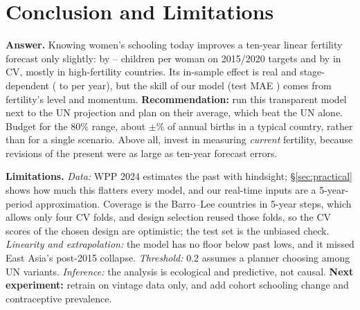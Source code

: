 \documentclass[11pt]{article}
\begin{document}
\section{Conclusion and Limitations}
\textbf{Answer.} Knowing women's schooling today improves a ten-year linear fertility forecast only slightly: by \eduGainLo--\eduGainHi{} children per woman on 2015/2020 targets and by \cvEduGainAbs{} in CV, mostly in high-fertility countries. Its in-sample effect is real and stage-dependent (\effTwo{} to \effSeven{} per year), but the skill of our model (test MAE \teMaeOurs) comes from fertility's level and momentum. \textbf{Recommendation:} run this transparent model next to the UN projection and plan on their average, which beat the UN alone. Budget for the 80\% range, about $\pm$\birthsMedErr\% of annual births in a typical country, rather than for a single scenario. Above all, invest in measuring \emph{current} fertility, because revisions of the present were as large as ten-year forecast errors.

\textbf{Limitations.} \emph{Data:} WPP 2024 estimates the past with hindsight; \S\ref{sec:practical} shows how much this flatters every model, and our real-time inputs are a 5-year-period approximation. Coverage is the \nCountries{} Barro--Lee countries in 5-year steps, which allows only four CV folds, and design selection reused those folds, so the CV scores of the chosen design are optimistic; the test set is the unbiased check. \emph{Linearity and extrapolation:} the model has no floor below past lows, and it missed East Asia's post-2015 collapse. \emph{Threshold:} 0.2 assumes a planner choosing among UN variants. \emph{Inference:} the analysis is ecological and predictive, not causal. \textbf{Next experiment:} retrain on vintage data only, and add cohort schooling change and contraceptive prevalence.

\end{document}
